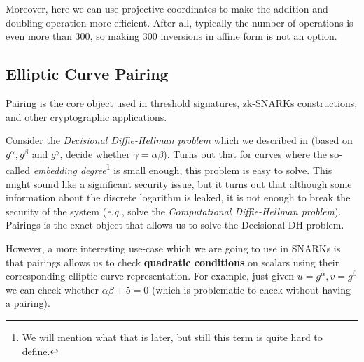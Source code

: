 \documentclass[../../book.tex]{subfiles}
\begin{document}
Moreover, here we can use projective coordinates to make the addition and doubling operation more efficient. After all, typically the number of operations is even more than $300$, so making $300$ inversions in affine form is not an option.

\vspace{-0.15mm}

\subsection{Elliptic Curve Pairing}\label{section:ecpairing}

\vspace{-0.15mm}

Pairing is the core object used in threshold signatures, zk-SNARKs
constructions, and other cryptographic applications. 

Consider the \textit{Decisional Diffie-Hellman problem} which we described in  
(based on $g^{\alpha},g^{\beta}$ and $g^{\gamma}$, decide whether $\gamma = \alpha\beta$). Turns out that for curves 
where the so-called \textit{embedding degree}\footnote{We will mention what that is later, but still this term is 
quite hard to define.} is small enough, this problem is easy to solve. This might sound like a significant security issue, but 
it turns out that although some information about the discrete logarithm is leaked, it is not enough to break the 
security of the system (\textit{e.g.}, solve the \textit{Computational Diffie-Hellman problem}). Pairings is the exact 
object that allows us to solve the Decisional DH problem.

However, a more interesting use-case which we are going to use in SNARKs is that pairings allows us to check 
\textbf{quadratic conditions} on scalars using their corresponding elliptic curve representation. For example, 
just given $u=g^{\alpha},v=g^{\beta}$ we can check whether $\alpha\beta+5=0$ (which is problematic to check without 
having a pairing). 
\end{document}
